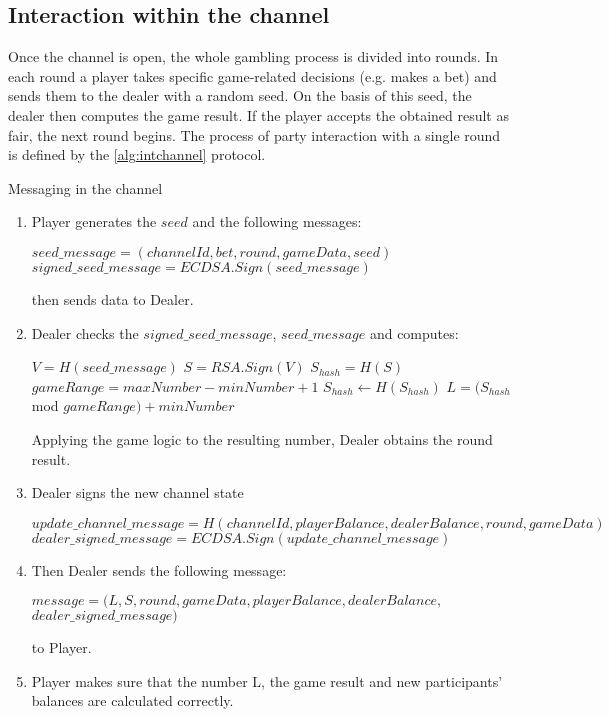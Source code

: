 \subsection {Interaction within the channel}

Once the channel is open, the whole gambling process is divided into rounds. In each round a player takes specific game-related decisions (e.g. makes a bet) and sends them to the dealer with a random seed. On the basis of this seed, the dealer then computes the game result. If the player accepts the obtained result as fair, the next round begins. The process of party interaction with a single round is defined by the \autoref{alg:intchannel} protocol. 

\begin{algorithm}
\caption{Messaging in the channel} \label{alg:intchannel}
\begin{enumerate}
	\item Player generates the $seed$ and the following  messages:
\begin{center}
$ seed\_message = (channelId, bet, round, gameData, seed)$
$signed\_seed\_message = ECDSA.Sign(seed\_message)$ 
\end{center}
 then sends data to Dealer. 
	\item Dealer checks the $signed\_seed\_message$, $seed\_message$ and computes:
 \begin{algorithmic}
\State $V = H(seed\_message)$
\State $S = RSA.Sign(V)$
\State $S_{hash} = H(S)$
\State $gameRange = maxNumber -  minNumber + 1$
\State$ S_{hash}\gets H(S_{hash})$
\EndWhile
\State $L = (S_{hash}$ mod $gameRange) + minNumber$
 \end{algorithmic}
 Applying the game logic to the resulting number, Dealer obtains the round result.
\item Dealer signs the new channel state
\begin{center}
$update\_channel\_message = H(channelId, playerBalance, dealerBalance, round, gameData)$
$dealer\_signed\_message = ECDSA.Sign(update\_channel\_message)$
\end{center}
\item Then Dealer sends the following message:
\begin{center}
 $message = (L,S, round, gameData, playerBalance, dealerBalance, $ \\ $dealer\_signed\_message)$
\end{center}
 to Player.
	\item Player makes sure that the number L, the game result and new participants' balances are calculated correctly.
\end{enumerate}
\end{algorithm}


